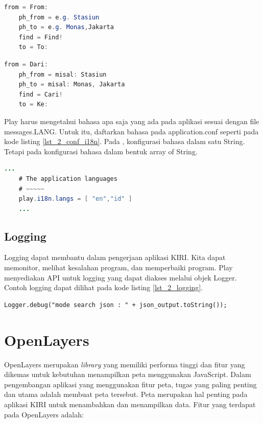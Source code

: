 \begin{lstlisting}[caption=Contoh messages.en untuk i18n,label = {lst_2_i18n_en},language=Java]
	from = From:
	ph_from = e.g. Stasiun
	ph_to = e.g. Monas,Jakarta
	find = Find!
	to = To:
\end{lstlisting}

\begin{lstlisting}[caption=Contoh messages.id untuk i18n,label = {lst_2_i18n_id},language=Java]
	from = Dari:
	ph_from = misal: Stasiun
	ph_to = misal: Monas, Jakarta
	find = Cari!
	to = Ke:
\end{lstlisting}

Play harus mengetahui bahasa apa saja yang ada pada aplikasi sesuai dengan file messages.LANG. Untuk itu, daftarkan bahasa pada application.conf seperti pada kode listing \ref{lst_2_conf_i18n}. Pada \cite{playforjava}, konfigurasi bahasa dalam satu String. Tetapi pada  konfigurasi bahasa dalam bentuk array of String.

\begin{lstlisting}[caption=Konfigurasi Bahasa i18n,label = {lst_2_conf_i18n},language=Java]
	...
	# The application languages
	# ~~~~~
	play.i18n.langs = [ "en","id" ]
	...
\end{lstlisting}

\subsection{Logging}
Logging dapat membantu dalam pengerjaan aplikasi KIRI. Kita dapat memonitor, melihat kesalahan program, dan memperbaiki program. Play menyediakan API untuk logging yang dapat diakses melalui objek Logger. Contoh logging dapat dilihat pada kode listing \ref{lst_2_logging}.

\begin{lstlisting}[caption=Contoh logging menggunakan objek Logger,label = {lst_2_logging}]
	 Logger.debug("mode search json : " + json_output.toString());
\end{lstlisting} 

\section{OpenLayers}
\label{sec:openlayers}
OpenLayers \cite{openlayersbook} merupakan \textit{library} yang memiliki performa tinggi dan fitur yang dikemas untuk kebutuhan menampilkan peta menggunakan JavaScript. Dalam pengembangan aplikasi yang menggunakan fitur peta, tugas yang paling penting dan utama adalah membuat peta tersebut. Peta merupakan hal penting pada aplikasi KIRI untuk menambahkan dan menampilkan data. Fitur yang terdapat pada OpenLayers adalah:

